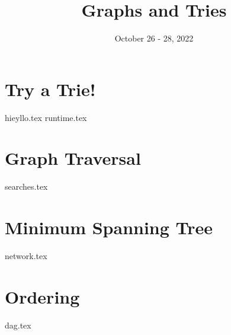 \documentclass[11pt]{exam}
\title{Graphs and Tries}
\date{October 26 - 28, 2022}
\begin{document}
\maketitle

\section{Try a Trie!}
\begin{questions}
{hieyllo.tex}
{runtime.tex}
\end{questions}

\pagebreak
\section{Graph Traversal}
\begin{questions}
{searches.tex}
\end{questions}

\pagebreak
\section{Minimum Spanning Tree}
\begin{questions}
{network.tex}
\end{questions}

\pagebreak
\section{Ordering}
\begin{questions}
{dag.tex}
\end{questions}
\end{document}
